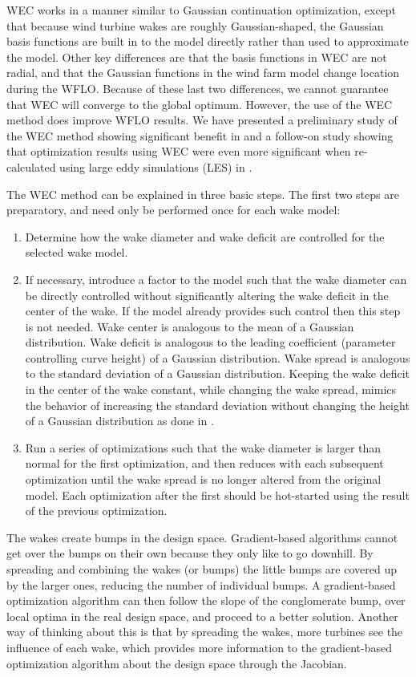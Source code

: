 \documentclass{jpconf}
\begin{document}
WEC works in a manner similar to Gaussian continuation optimization, except that because wind turbine wakes are roughly Gaussian-shaped, the Gaussian basis functions are built in to the model directly rather than used to approximate the model. Other key differences are that the basis functions in WEC are not radial, and that the Gaussian functions in the wind farm model change location during the WFLO. Because of these last two differences, we cannot guarantee that WEC will converge to the global optimum. However, the use of the WEC method does improve WFLO results. We have presented a preliminary study of the WEC method showing significant benefit in \cite{thomas2018-wec} and a follow-on study showing that optimization results using WEC were even more significant when re-calculated using large eddy simulations (LES) in \cite{thomas2019-les-validation}.

The WEC method can be explained in three basic steps. The first two steps are preparatory, and need only be performed once for each wake model:
\begin{enumerate}[label=\arabic*)]
	\item Determine how the wake diameter and wake deficit are controlled for the selected wake model.
    \item If necessary, introduce a factor to the model such that the wake diameter can be directly controlled without significantly altering the wake deficit in the center of the wake. If the model already provides such control then this step is not needed. Wake center is analogous to the mean of a Gaussian distribution. Wake deficit is analogous to the leading coefficient (parameter controlling curve height) of a Gaussian distribution. Wake spread is analogous to the standard deviation of a Gaussian distribution.  Keeping the wake deficit in the center of the wake constant, while changing the wake spread, mimics the behavior of increasing the standard deviation without changing the height of a Gaussian distribution as done in \cite{mobahi2015}. 
    \item Run a series of optimizations such that the wake diameter is larger than normal for the first optimization, and then reduces with each subsequent optimization until the wake spread is no longer altered from the original model. Each optimization after the first should be hot-started using the result of the previous optimization.
\end{enumerate}

The wakes create bumps in the design space. Gradient-based algorithms cannot get over the bumps on their own because they only like to go downhill. By spreading and combining the wakes (or bumps) the little bumps are covered up by the larger ones, reducing the number of individual bumps. A gradient-based optimization algorithm can then follow the slope of the conglomerate bump, over local optima in the real design space, and proceed to a better solution. Another way of thinking about this is that by spreading the wakes, more turbines see the influence of each wake, which provides more information to the gradient-based optimization algorithm about the design space through the Jacobian. 
\end{document}
